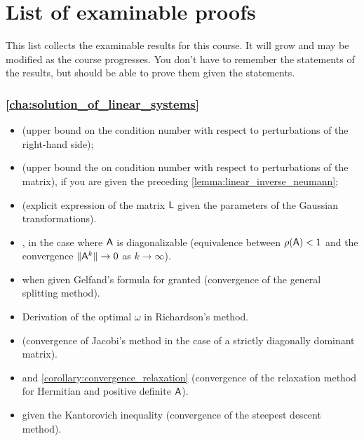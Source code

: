 \chapter*{List of examinable proofs}%
This list collects the examinable results for this course.
It will grow and may be modified as the course progresses.
You don't have to remember the statements of the results,
but should be able to prove them given the statements.

\subsection*{\cref{cha:solution_of_linear_systems}}%

\begin{itemize}
    \item {} (upper bound on the condition number with respect to perturbations of the right-hand side);
    \item {} (upper bound the on condition number with respect to perturbations of the matrix),
        if you are given the preceding \cref{lemma:linear_inverse_neumann};
    \item {} (explicit expression of the matrix $\mathsf L$ given the parameters of the Gaussian transformations).
    \item {},
        in the case where $\mathsf A$ is diagonalizable (equivalence between $\rho(\mathsf A) < 1$ and the convergence $\lVert\mathsf A^k\rVert \to 0$ as $k \to \infty$).

    \item {} when given Gelfand's formula for granted (convergence of the general splitting method).
    \item Derivation of the optimal $\omega$ in Richardson's method.
    \item {} (convergence of Jacobi's method in the case of a strictly diagonally dominant matrix).
    \item {} and \cref{corollary:convergence_relaxation} (convergence of the relaxation method for Hermitian and positive definite $\mathsf A$).
    \item {} given the Kantorovich inequality (convergence of the steepest descent method).
\end{itemize}

